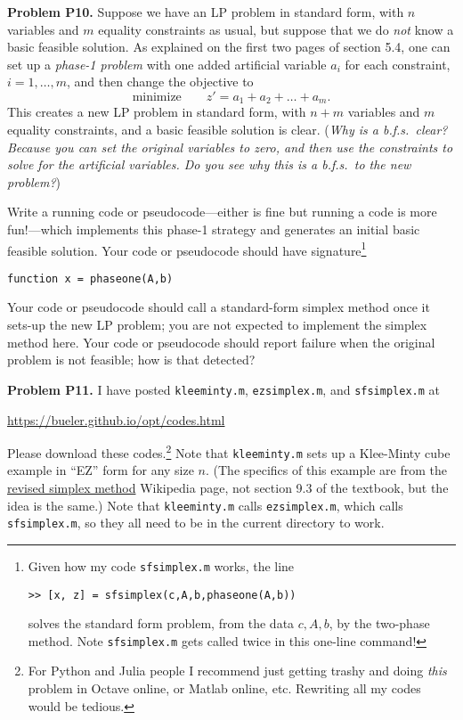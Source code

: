 \documentclass[12pt]{amsart}
\newcommand{\prob}[1]{\bigskip\noindent\textbf{#1}\quad }
\begin{document}
\prob{Problem P10.}  Suppose we have an LP problem in standard form, with $n$ variables and $m$ equality constraints as usual, but suppose that we do \emph{not} know a basic feasible solution.  As explained on the first two pages of section 5.4, one can set up a \emph{phase-1 problem} with one added artificial variable $a_i$ for each constraint, $i=1,\dots,m$, and then change the objective to
    $$\text{minimize} \qquad z' = a_1 + a_2 + \dots + a_m.$$
This creates a new LP problem in standard form, with $n+m$ variables and $m$ equality constraints, and a basic feasible solution is clear.  (\emph{Why is a b.f.s.~clear?  Because you can set the original variables to zero, and then use the constraints to solve for the artificial variables.  Do you see why this is a b.f.s.~to the new problem?})

Write a running code or pseudocode---either is fine but running a code is more fun!---which implements this phase-1 strategy and generates an initial basic feasible solution.  Your code or pseudocode should have signature\footnote{Given how my code \texttt{sfsimplex.m} works, the line\par
\centerline{\texttt{>> [x, z] = sfsimplex(c,A,b,phaseone(A,b))}}\par
\noindent solves the standard form problem, from the data $c,A,b$, by the two-phase method.  Note \texttt{sfsimplex.m} gets called twice in this one-line command!}

\centerline{\texttt{function x = phaseone(A,b)}}

\medskip
\noindent Your code or pseudocode should call a standard-form simplex method once it sets-up the new LP problem; you are not expected to implement the simplex method here.  Your code or pseudocode should report failure when the original problem is not feasible; how is that detected?


\prob{Problem P11.}  I have posted \texttt{kleeminty.m}, \texttt{ezsimplex.m}, and \texttt{sfsimplex.m} at

\centerline{\url{https://bueler.github.io/opt/codes.html}}

\noindent Please download these codes.\footnote{For Python and Julia people I recommend just getting trashy and doing \emph{this} problem in Octave online, or Matlab online, etc.  Rewriting all my codes would be tedious.}  Note that \texttt{kleeminty.m} sets up a Klee-Minty cube example in ``EZ'' form for any size $n$.  (The specifics of this example are from the \href{https://en.wikipedia.org/wiki/Revised_simplex_method}{revised simplex method} Wikipedia page, not section 9.3 of the textbook, but the idea is the same.)  Note that \texttt{kleeminty.m} calls \texttt{ezsimplex.m}, which calls \texttt{sfsimplex.m}, so they all need to be in the current directory to work.
\end{document}
